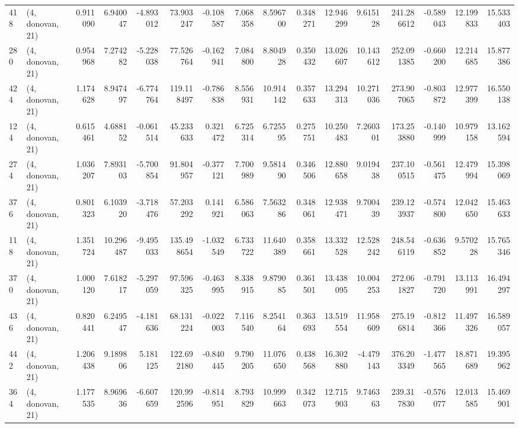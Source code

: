 \begin{tabular}{llrrrrrrrrrrrrrr}
418 &  (4, donovan, 21) &   0.911090 &   6.940047 &  -4.893012 &    73.903247 &  -0.108587 &   7.068358 &   8.596700 &  0.348271 &  12.946299 &   9.615128 &   241.286612 &  -0.589043 &  12.199833 &  15.533403 \\
280 &  (4, donovan, 21) &   0.954968 &   7.274282 &  -5.228038 &    77.526764 &  -0.162941 &   7.084800 &   8.804928 &  0.350432 &  13.026607 &  10.143612 &   252.091385 &  -0.660200 &  12.214685 &  15.877386 \\
424 &  (4, donovan, 21) &   1.174628 &   8.947497 &  -6.774764 &   119.118497 &  -0.786838 &   8.556931 &  10.914142 &  0.357633 &  13.294313 &  10.271036 &   273.907065 &  -0.803872 &  12.977399 &  16.550138 \\
124 &  (4, donovan, 21) &   0.615461 &   4.688152 &  -0.061514 &    45.233633 &   0.321472 &   6.725314 &   6.725595 &  0.275751 &  10.250483 &   7.260301 &   173.253880 &  -0.140999 &  10.979158 &  13.162594 \\
274 &  (4, donovan, 21) &   1.036207 &   7.893103 &  -5.700854 &    91.804957 &  -0.377121 &   7.700989 &   9.581490 &  0.346506 &  12.880658 &   9.019438 &   237.100515 &  -0.561475 &  12.479994 &  15.398069 \\
376 &  (4, donovan, 21) &   0.801323 &   6.103920 &  -3.718476 &    57.203292 &   0.141921 &   6.586063 &   7.563286 &  0.348061 &  12.938471 &   9.700439 &   239.123937 &  -0.574800 &  12.042650 &  15.463633 \\
118 &  (4, donovan, 21) &   1.351724 &  10.296487 &  -9.495033 &   135.498654 &  -1.032549 &   6.733722 &  11.640389 &  0.358661 &  13.332528 &  12.528242 &   248.546119 &  -0.636852 &   9.570228 &  15.765346 \\
370 &  (4, donovan, 21) &   1.000120 &   7.618217 &  -5.297059 &    97.596325 &  -0.463995 &   8.338915 &   9.879085 &  0.361501 &  13.438095 &  10.004253 &   272.061827 &  -0.791720 &  13.113991 &  16.494297 \\
436 &  (4, donovan, 21) &   0.820441 &   6.249547 &  -4.181636 &    68.131224 &  -0.022003 &   7.116540 &   8.254164 &  0.363693 &  13.519554 &  11.958609 &   275.196814 &  -0.812366 &  11.497326 &  16.589057 \\
442 &  (4, donovan, 21) &   1.206438 &   9.189806 &   5.181125 &   122.692180 &  -0.840445 &   9.790205 &  11.076650 &  0.438568 &  16.302880 &  -4.479143 &   376.203349 &  -1.477565 &  18.871689 &  19.395962 \\
364 &  (4, donovan, 21) &   1.177535 &   8.969636 &  -6.607659 &   120.992596 &  -0.814951 &   8.793829 &  10.999663 &  0.342073 &  12.715903 &   9.746363 &   239.317830 &  -0.576077 &  12.013585 &  15.469901 \\

\end{tabular}

